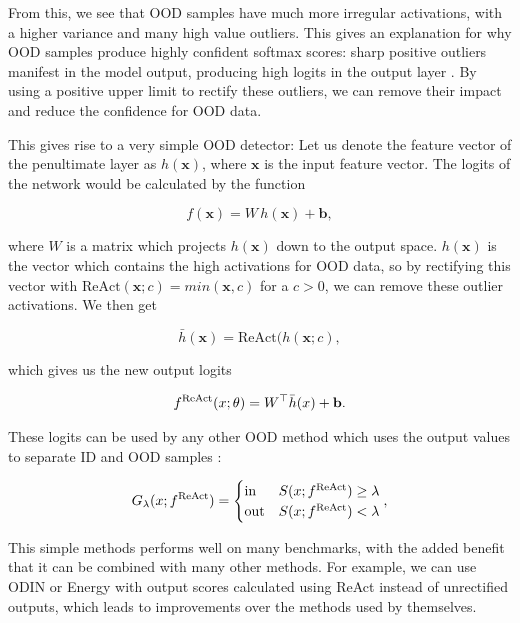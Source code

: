 \documentclass[UKenglish]{uiomasterthesis} %
\theoremstyle{definition}
\begin{document}
From this, we see that OOD samples have much more irregular activations, with a higher variance and many high value outliers. This gives an explanation for why OOD samples produce highly confident softmax scores: sharp positive outliers manifest in the model output, producing high logits in the output layer \cite{react}. By using a positive upper limit to rectify these outliers, we can remove their impact and reduce the confidence for OOD data.

This gives rise to a very simple OOD detector: Let us denote the feature vector of the penultimate layer as $h(\bm{x})$, where $\bm{x}$ is the input feature vector. The logits of the network would be calculated by the function

\begin{equation}\label{dog}
  f(\bm{x}) = W \, h(\bm{x}) + \bm{b},
\end{equation}

where $W$ is a matrix which projects $h(\bm{x})$ down to the output space. $h(\bm{x})$ is the vector which contains the high activations for OOD data, so by rectifying this vector with $\text{ReAct}(\bm{x}; c) = min(\bm{x}, c)$ for a $c > 0$, we can remove these outlier activations. We then get

\begin{equation}\label{dog}
  \bar{h}(\bm{x}) = \text{ReAct}(h(\bm{x}; c),
\end{equation}

which gives us the new output logits 

\begin{align}
f^{\text{ReAct}}(\*x;\theta) = \*W^\top \bar h(\*x) + \mathbf{b}.
\end{align}

These logits can be used by any other OOD method which uses the output values to separate ID and OOD samples \cite{react}:

\begin{align}
\label{eq:threshold}
	G_{\lambda}(\*x; f^\text{ReAct})=\begin{cases} 
      \text{in } & S(\*x;f^\text{ReAct})\ge \lambda \\
      \text{out} & S(\*x;f^\text{ReAct}) < \lambda 
   \end{cases},
\end{align}

This simple methods performs well on many benchmarks, with the added benefit that it can be combined with many other methods. For example, we can use ODIN or Energy with output scores calculated using ReAct instead of unrectified outputs, which leads to improvements over the methods used by themselves.
\\
\end{document}
